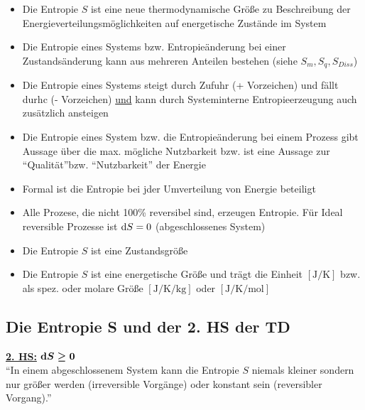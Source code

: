 \begin{itemize}
	\item Die Entropie $S$ ist eine neue thermodynamische Größe zu Beschreibung der Energieverteilungsmöglichkeiten auf energetische Zustände im System
	\item Die Entropie eines Systems bzw. Entropieänderung bei einer Zustandsänderung kann aus mehreren Anteilen bestehen (siehe $S_m, S_q, S_{Diss}$)
	\item Die Entropie eines Systems steigt durch Zufuhr (+ Vorzeichen) und fällt durhc (- Vorzeichen) \underline{und} kann durch Systeminterne Entropieerzeugung auch zusätzlich ansteigen
	\item Die Entropie eines System bzw. die Entropieänderung bei einem Prozess gibt Aussage über die max. mögliche Nutzbarkeit bzw. ist eine Aussage zur "`Qualität"'bzw. "`Nutzbarkeit"' der Energie
	\item Formal ist die Entropie bei jder Umverteilung von Energie beteiligt
	\item Alle Prozese, die nicht 100\% reversibel sind, erzeugen Entropie. \linebreak 
	Für Ideal reversible Prozesse ist $\mathop{}\!\mathrm{d} S=0$ (abgeschlossenes System)
	\item Die Entropie $S$ ist eine Zustandsgröße
	\item Die Entropie $S$ ist eine energetische Größe und trägt die Einheit $\left[\si{\joule \per \kelvin}\right]$ bzw. als spez. oder molare Größe $\left[\si{\joule \per \kelvin \per \kg}\right]$ oder $\left[\si{\joule \per \kelvin \per \mol}\right]$
\end{itemize}

\subsection{Die Entropie S und der 2. HS der TD}
\underline{\textbf{2. HS:}} \quad \quad $\boldsymbol{\mathop{}\!\mathrm{d} S \geq 0}$\\
"`In einem abgeschlossenem System kann die Entropie $S$ niemals kleiner sondern nur größer werden (irreversible Vorgänge) oder konstant sein (reversibler Vorgang)."' 

